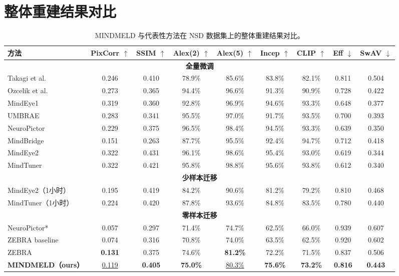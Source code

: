 \section{整体重建结果对比}

\begin{table}[t]
  \centering
  \setlength{\tabcolsep}{3pt}
  \footnotesize
  \caption{MINDMELD 与代表性方法在 NSD 数据集上的整体重建结果对比。}
  \label{tab:main_results}
  \begin{tabular}{lcccccccc}
    \toprule
    方法 & PixCorr $\uparrow$ & SSIM $\uparrow$ & Alex(2) $\uparrow$ & Alex(5) $\uparrow$ & Incep $\uparrow$ & CLIP $\uparrow$ & Eff $\downarrow$ & SwAV $\downarrow$ \\
    \midrule
    \multicolumn{9}{c}{\textbf{全量微调}} \\
    \midrule
    Takagi et al. & 0.246 & 0.410 & 78.9\% & 85.6\% & 83.8\% & 82.1\% & 0.811 & 0.504 \\
    Ozcelik et al. & 0.273 & 0.365 & 94.4\% & 96.6\% & 91.3\% & 90.9\% & 0.728 & 0.422 \\
    MindEye1 & 0.319 & 0.360 & 92.8\% & 96.9\% & 94.6\% & 93.3\% & 0.648 & 0.377 \\
    UMBRAE & 0.283 & 0.341 & 95.5\% & 97.0\% & 91.7\% & 93.5\% & 0.700 & 0.393 \\
    NeuroPictor & 0.229 & 0.375 & 96.5\% & 98.4\% & 94.5\% & 93.3\% & 0.639 & 0.350 \\
    MindBridge & 0.151 & 0.263 & 87.7\% & 95.5\% & 92.4\% & 94.7\% & 0.712 & 0.418 \\
    MindEye2 & 0.322 & 0.431 & 96.1\% & 98.6\% & 95.4\% & 93.0\% & 0.619 & 0.344 \\
    MindTuner & 0.322 & 0.421 & 95.8\% & 98.8\% & 95.6\% & 93.8\% & 0.612 & 0.340 \\
    \midrule
    \multicolumn{9}{c}{\textbf{少样本迁移}} \\
    \midrule
    MindEye2（1小时） & 0.195 & 0.419 & 84.2\% & 90.6\% & 81.2\% & 79.2\% & 0.810 & 0.468 \\
    MindTuner（1小时） & 0.224 & 0.420 & 87.8\% & 93.6\% & 84.8\% & 83.5\% & 0.780 & 0.440 \\
    \midrule
    \multicolumn{9}{c}{\textbf{零样本迁移}} \\
    \midrule
    NeuroPictor* & 0.057 & 0.297 & 71.4\% & 74.7\% & 62.5\% & 66.0\% & 0.939 & 0.607 \\
    ZEBRA baseline & 0.074 & 0.316 & 70.8\% & 74.0\% & 63.5\% & 62.5\% & 0.920 & 0.602 \\
    ZEBRA & \textbf{0.131} & 0.375 & 74.6\% & \textbf{81.2\%} & 72.2\% & 71.5\% & 0.837 & 0.506 \\
    \textbf{MINDMELD（ours）} & \underline{0.119} & \textbf{0.405} & \textbf{75.0\%} & \underline{80.3\%} & \textbf{75.6\%} & \textbf{73.2\%} & \textbf{0.816} & \textbf{0.443} \\
    \bottomrule
  \end{tabular}
\end{table}

